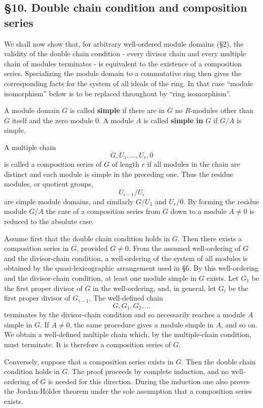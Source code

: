 \documentclass[11pt]{article}
\begin{document}
\subsection{§10. Double chain condition and composition
series}\label{double-chain-condition-and-composition-series}

We shall now show that, for arbitrary well-ordered module domains (§2),
the validity of the double chain condition - every divisor chain and
every multiple chain of modules terminates - is equivalent to the
existence of a composition series. Specializing the module domain to a
commutative ring then gives the corresponding facts for the system of
all ideals of the ring. In that case ``module isomorphism'' below is to
be replaced throughout by ``ring isomorphism''.

A module domain \(G\) is called \textbf{simple} if there are in \(G\) no
\(R\)-modules other than \(G\) itself and the zero module \(0\). A
module \(A\) is called \textbf{simple in} \(G\) if \(G/A\) is simple.

A multiple chain \[
  G,U_1,
\ldots,U_r,0
\] is called a composition series of \(G\) of length \(r\) if all
modules in the chain are distinct and each module is simple in the
preceding one. Thus the residue modules, or quotient groups, \[
  U_{i-1}/U_i
\] are simple module domains, and similarly \(G/U_1\) and \(U_r/0\). By
forming the residue module \(G/A\) the case of a composition series from
\(G\) down to a module \(A\ne0\) is reduced to the absolute case.

Assume first that the double chain condition holds in \(G\). Then there
exists a composition series in \(G\), provided \(G\ne0\). From the
assumed well-ordering of \(G\) and the divisor-chain condition, a
well-ordering of the system of all modules is obtained by the
quasi-lexicographic arrangement used in §6. By this well-ordering and
the divisor-chain condition, at least one module simple in \(G\) exists.
Let \(G_1\) be the first proper divisor of \(G\) in the well-ordering,
and, in general, let \(G_i\) be the first proper divisor of \(G_{i-1}\).
The well-defined chain \[
  G,G_1,G_2,
\ldots
\] terminates by the divisor-chain condition and so necessarily reaches
a module \(A\) simple in \(G\). If \(A\ne0\), the same procedure gives a
module simple in \(A\), and so on. We obtain a well-defined multiple
chain which, by the multiple-chain condition, must terminate. It is
therefore a composition series of \(G\).

Conversely, suppose that a composition series exists in \(G\). Then the
double chain condition holds in \(G\). The proof proceeds by complete
induction, and no well-ordering of \(G\) is needed for this direction.
During the induction one also proves the Jordan-Hölder theorem under the
sole assumption that a composition series exists.
\end{document}

